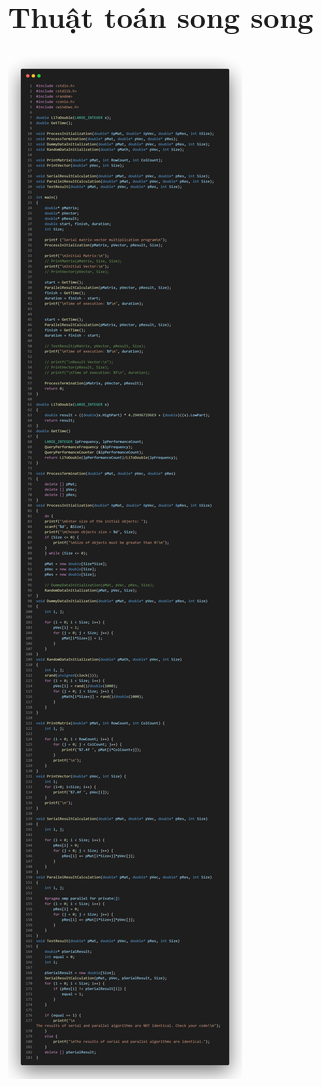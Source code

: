 \documentclass[12pt,a4paper]{report}
\begin{document}
\section{Thuật toán song song}
\begin{center}
	\includegraphics[trim=0in 68in 0in 0in, clip, scale=0.2]{./Photos/MatMul/parallel.PNG}

\end{center}
\end{document}
